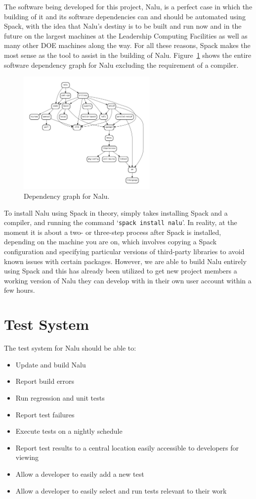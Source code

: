 \documentclass[12pt, oneside]{article}
\begin{document}
The software being developed for this project, Nalu, is a perfect case in which the building of it and its software dependencies can and should be automated using Spack, with the idea that Nalu's destiny is to be built and run now and in the future on the largest machines at the Leadership Computing Facilities as well as many other DOE machines along the way. For all these reasons, Spack makes the most sense as the tool to assist in the building of Nalu. Figure~\ref{fig:nalu-deps} shows the entire software dependency graph for Nalu excluding the requirement of a compiler.

\begin{figure}
  \centering
    \includegraphics[width=0.6\textwidth]{nalu-graph}
  \caption{Dependency graph for Nalu.}
  \label{fig:nalu-deps}
\end{figure}

To install Nalu using Spack in theory, simply takes installing Spack and a compiler, and running the command `\texttt{spack install nalu}'. In reality, at the moment it is about a two- or three-step process after Spack is installed, depending on the machine you are on, which involves copying a Spack configuration and specifying particular versions of third-party libraries to avoid known issues with certain packages. However, we are able to build Nalu entirely using Spack and this has already been utilized to get new project members a working version of Nalu they can develop with in their own user account within a few hours.

\section{Test System}

The test system for Nalu should be able to:
\begin{itemize}
	\item Update and build Nalu
	\item Report build errors
	\item Run regression and unit tests
	\item Report test failures
	\item Execute tests on a nightly schedule
	\item Report test results to a central location easily accessible to developers for viewing
	\item Allow a developer to easily add a new test
	\item Allow a developer to easily select and run tests relevant to their work
\end{itemize}
\end{document}
